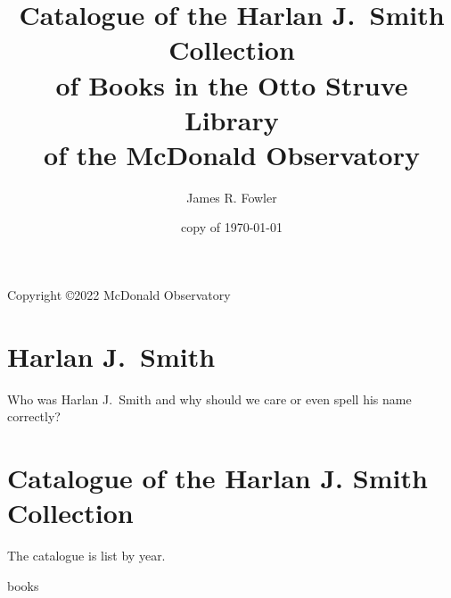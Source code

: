 \documentclass{article}%
\begin{document}
\title{Catalogue of the Harlan J.~Smith Collection \\
  of Books in the Otto Struve Library \\
  of the McDonald Observatory}
\author{James R. Fowler}
\date{copy of \today}
\maketitle

\vspace*{5 in}
\centerline{Copyright \copyright 2022 McDonald Observatory}

\section*{Harlan J.~Smith}

Who was Harlan J.~Smith and why should we care or even
spell his name correctly?


\section*{Catalogue of the Harlan J. Smith Collection}

The catalogue is list by year.

{books}
\end{document}
